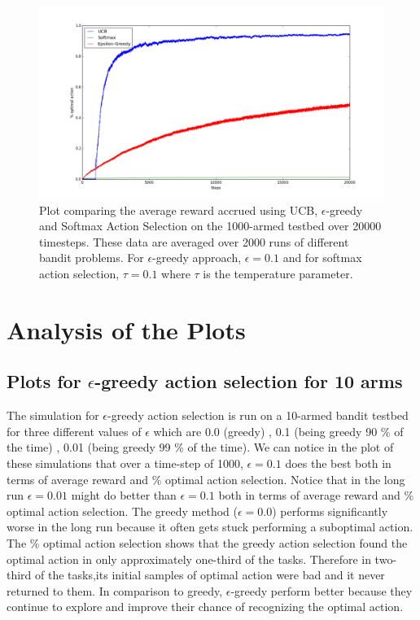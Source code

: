 \documentclass[english]{article}
\begin{document}
\begin{figure}[H]
  \includegraphics[width=\linewidth]{compare_ucb_1000_arms_20000_steps_optimal_action.png}
  \caption{Plot comparing the average reward accrued using UCB, $\epsilon$-greedy and Softmax Action Selection on the 1000-armed testbed over 20000 timesteps. These data are averaged over 2000 runs of different bandit problems. For $\epsilon$-greedy approach, $\epsilon = 0.1 $ and for softmax action selection, $\tau = 0.1$ where $\tau$ is the temperature parameter.}
  \label{fig:eg1}
\end{figure}

\section{Analysis of the Plots}
\subsection{Plots for $\epsilon$-greedy action selection for 10 arms}
The simulation for $\epsilon$-greedy action selection is run on a 10-armed bandit testbed for three different values of $\epsilon$ which are 0.0 (greedy) , 0.1 (being greedy 90 \% of the time) , 0.01 (being greedy 99 \% of the time). We can notice in the plot of these simulations that over a time-step of 1000, $\epsilon = 0.1$ does the best both in terms of average reward and \% optimal action selection. Notice that in the long run $\epsilon = 0.01$ might do better than $\epsilon = 0.1$ both in terms of average reward and \% optimal action selection. The greedy method ($\epsilon = 0.0$) performs significantly worse in the long run because it often gets stuck performing a suboptimal action. The \% optimal action selection shows that the greedy action selection found the optimal action in only approximately one-third of the tasks. Therefore in two-third of the tasks,its initial samples of optimal action were bad and it never returned to them. In comparison to greedy, $\epsilon$-greedy perform better because they continue to explore and improve their chance of recognizing the optimal action.
\end{document}
